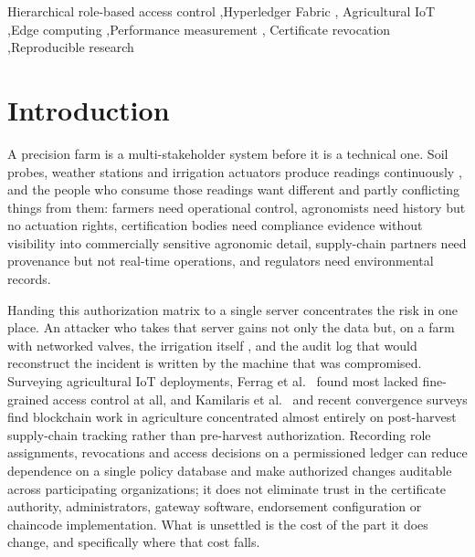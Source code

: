 \documentclass[a4paper,fleqn]{cas-sc}
\begin{document}
\begin{keywords}
Hierarchical role-based access control \sep Hyperledger Fabric \sep
Agricultural IoT \sep Edge computing \sep Performance measurement \sep
Certificate revocation \sep Reproducible research
\end{keywords}

\maketitle

\section{Introduction}
\label{sec:intro}

A precision farm is a multi-stakeholder system before it is a technical one.
Soil probes, weather stations and irrigation actuators produce readings
continuously \cite{zhang2002precision}, and the people who consume those
readings want different and partly conflicting things from them: farmers
need operational control, agronomists need history but no actuation rights,
certification bodies need compliance evidence without visibility into
commercially sensitive agronomic detail, supply-chain partners need
provenance but not real-time operations, and regulators need environmental
records.

Handing this authorization matrix to a single server concentrates the risk
in one place. An attacker who takes that server gains not only the data but,
on a farm with networked valves, the irrigation itself
\cite{benedict2021decentralized}, and the audit log that would reconstruct
the incident is written by the machine that was compromised. Surveying
agricultural IoT deployments, Ferrag et al.\ \cite{ferrag2020security} found
most lacked fine-grained access control at all, and Kamilaris et
al.\ \cite{kamilaris2019rise} and recent convergence surveys
\cite{rustemi2025synergizing} find blockchain work in agriculture
concentrated almost entirely on post-harvest supply-chain tracking rather
than pre-harvest authorization. Recording role assignments, revocations
and access decisions on a permissioned ledger can reduce dependence on a
single policy database and make authorized changes auditable across
participating organizations; it does not eliminate trust in the
certificate authority, administrators, gateway software, endorsement
configuration or chaincode implementation. What is unsettled is the
cost of the part it does change, and specifically where that cost falls.
\end{document}
